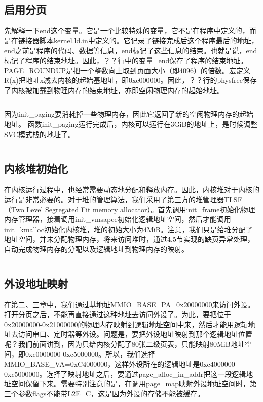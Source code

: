 \documentclass[main.tex]{subfiles}
\begin{document}
\begin{CJK*}{UTF8}{song}
\subsection{启用分页}
先解释一下end这个变量。它是一个比较特殊的变量，它不是在程序中定义的，而是在链接器脚本kernel.ld.in中定义的。它记录了链接完成后这个程序最后的地址，end之前是程序的代码、数据等信息，end标记了这些信息的结束。也就是说，end标记了程序的结束地址。因此，？？行中的变量\_end保存了程序的结束地址。PAGE\_ROUNDUP是把一个整数向上取到页面大小（即4096）的倍数。宏定义R(x)把地址x减去内核的起始基地址，即0xc000000。因此，？？行的physfree保存了内核被加载到物理内存的结束地址，亦即空闲物理内存的起始地址。
\inputminted[firstline=368,lastline=373,linenos,numbersep=5pt,frame=lines,framesep=2mm]{c}{src/chapter04/kernel/machdep.c}
因为init\_paging要消耗掉一些物理内存，因此它返回了新的空闲物理内存的起始地址。
函数init\_paging运行完成后，内核可以运行在3GiB的地址上，是时候调整SVC模式栈的地址了。

\inputminted[firstline=375,lastline=378,linenos,numbersep=5pt,frame=lines,framesep=2mm]{c}{src/chapter04/kernel/machdep.c}

\subsection{内核堆初始化}
在内核运行过程中，也经常需要动态地分配和释放内存。因此，内核堆对于内核的运行是非常必要的。对于堆的管理算法，我们采用了第三方的堆管理器TLSF（Two Level Segregated Fit memory allocator）。首先调用init\_frame初始化物理内存管理器，接着调用init\_vmsapce初始化逻辑地址空间，然后才能调用init\_kmalloc初始化内核堆，堆的初始大小为4MiB。注意，我们只是给堆分配了地址空间，并未分配物理内存，将来访问堆时，通过4.5节实现的缺页异常处理，自动完成物理内存的分配以及逻辑地址到物理内存的映射。

\inputminted[firstline=380,lastline=394,linenos,numbersep=5pt,frame=lines,framesep=2mm]{c}{src/chapter04/kernel/machdep.c}

\subsection{外设地址映射}
在第二、三章中，我们通过基地址MMIO\_BASE\_PA=0x20000000来访问外设。打开分页之后，不能再直接通过这种地址去访问外设了。为此，要把位于0x20000000-0x21000000的物理内存映射到逻辑地址空间中来，然后才能用逻辑地址去访问串口、定时器等外设。问题是，要把外设地址映射到那个逻辑地址位置呢？我们前面讲到，因为只给内核分配了80张二级页表，只能映射80MiB地址空间，即0xc0000000-0xc5000000。所以，我们选择MMIO\_BASE\_VA=0xC4000000，这样外设所在的逻辑地址是0xc4000000-0xc5000000。选择了映射地址之后，要通过page\_alloc\_in\_addr把这一段逻辑地址空间保留下来。需要特别注意的是，在调用page\_map映射外设地址空间时，第三个参数flags不能带L2E\_C，这是因为外设的存储不能被缓存。


\end{CJK*}
\end{document}
